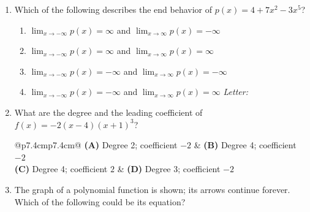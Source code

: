 \documentclass[10pt]{article}
\begin{document}
\begin{enumerate}[leftmargin=1.9em, itemsep=10pt]

\item Which of the following describes the end behavior of $p(x) = 4 + 7x^2 - 3x^5$?
      \begin{enumerate}[leftmargin=2.6em, itemsep=1pt]
        \item[(A)] $\lim_{x \to -\infty} p(x) = \infty$ and $\lim_{x \to \infty} p(x) = -\infty$
        \item[(B)] $\lim_{x \to -\infty} p(x) = \infty$ and $\lim_{x \to \infty} p(x) = \infty$
        \item[(C)] $\lim_{x \to -\infty} p(x) = -\infty$ and $\lim_{x \to \infty} p(x) = -\infty$
        \item[(D)] $\lim_{x \to -\infty} p(x) = -\infty$ and $\lim_{x \to \infty} p(x) = \infty$
        \hfill\textit{Letter:}~\gradedblank[id=ap1, type=choice, points=1, answer=A]{0.42in}{13pt}
      \end{enumerate}

\item What are the degree and the leading coefficient of $f(x) = -2(x - 4)(x + 1)^3$?

      \smallskip
      \begin{tabular}{@{}p{7.4cm}p{7.4cm}@{}}
      \textbf{(A)} Degree 2; coefficient $-2$ & \textbf{(B)} Degree 4; coefficient $-2$ \\[2pt]
      \textbf{(C)} Degree 4; coefficient $2$ & \textbf{(D)} Degree 3; coefficient $-2$
      \hfill{}
      \end{tabular}

\item \begin{minipage}[t]{0.56\linewidth}
      The graph of a polynomial function is shown; its arrows continue forever. Which of the
      following could be its equation?


\end{minipage}
\end{enumerate}
\end{document}
